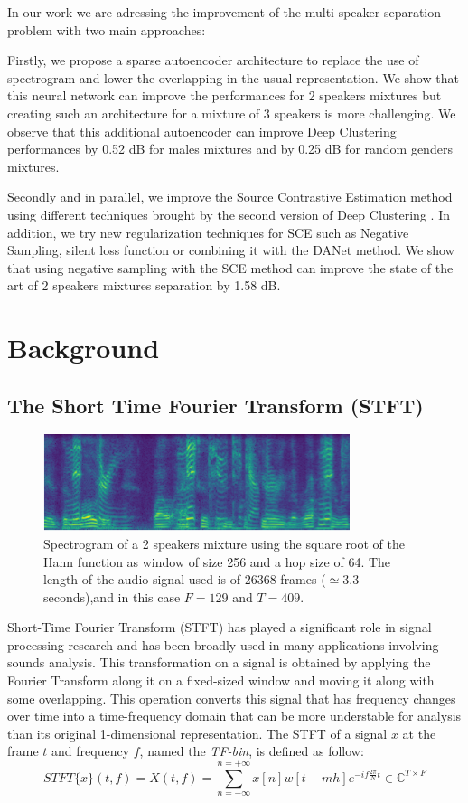 \documentclass[master, tikz, final,11pt, dvipdfmx]{iscs-thesis}
\begin{document}
In our work we are adressing the improvement of the multi-speaker separation problem with two main approaches:

Firstly, we propose a sparse autoencoder architecture to replace the use of spectrogram and lower the overlapping in the usual representation. We show that this neural network can improve the performances for 2 speakers mixtures but creating such an architecture for a mixture of 3 speakers is more challenging. We observe that this additional autoencoder can improve Deep Clustering performances by 0.52 dB for males mixtures and by 0.25 dB for random genders mixtures.

Secondly and in parallel, we improve the Source Contrastive Estimation method using different techniques brought by the second version of Deep Clustering \cite{DPCLV2}. In addition, we try new regularization techniques for SCE such as Negative Sampling, silent loss function or combining it with the DANet \cite{DANet} method. We show that using negative sampling with the SCE method can improve the state of the art of 2 speakers mixtures separation by 1.58 dB.

\chapter{Background}
\section{The Short Time Fourier Transform (STFT)}

\begin{figure}[b]
\centering
\includegraphics[width=0.8\textwidth]{xmix}
\caption[Spectrogram of a 2 speaker mixture]{Spectrogram of a 2 speakers mixture using the square root of the Hann function as window of size 256 and a hop size of 64. The length of the audio signal used is of 26368 frames ($\simeq 3.3$ seconds),and in this case $F = 129$ and $T = 409$.}
\label{fig:spectrogram} 
\end{figure}


Short-Time Fourier Transform (STFT) has played a significant role in signal processing research and has been broadly used in many applications involving sounds analysis.
This transformation on a signal is obtained by applying the Fourier Transform along it on a fixed-sized window and moving it along with some overlapping. This operation converts this signal that has frequency changes over time into a time-frequency domain that can be more understable for analysis than its original 1-dimensional representation.
The STFT of a signal $x$ at the frame $t$ and frequency $f$, named the \textit{TF-bin}, is defined as follow:
\[
	STFT\{x\}(t,f) = X(t,f) = \sum_{n=-\infty}^{n=+\infty}x[n]w[t-mh]e^{-if\frac{2\pi}{N}t } \in \mathbb{C}^{T\times F}
\]
\end{document}
